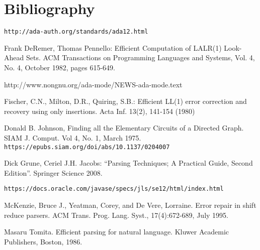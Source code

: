 \documentclass{article}
\begin{document}
\section{Bibliography}
\begin{thebibliography}{9}

 \verb|http://ada-auth.org/standards/ada12.html|

 Frank DeRemer, Thomas Pennello: Efficient
  Computation of LALR(1) Look-Ahead Sets. ACM Transactions on
  Programming Languages and Systems, Vol. 4, No. 4, October 1982,
  pages 615-649.

 http://www.nongnu.org/ada-mode/NEWS-ada-mode.text

  Fischer, C.N., Milton, D.R., Quiring, S.B.:
  Efficient LL(1) error correction and recovery using only insertions.
  Acta Inf. 13(2), 141-154 (1980)

 Donald B. Johnson, Finding all the Elementary Circuits of a Directed Graph.
SIAM J. Comput. Vol 4, No. 1, March 1975.\\ \verb|https://epubs.siam.org/doi/abs/10.1137/0204007|

 Dick Grune, Ceriel J.H. Jacobs: ``Parsing Techniques; A Practical Guide, Second
  Edition''. Springer Science  2008.

  \verb|https://docs.oracle.com/javase/specs/jls/se12/html/index.html|

 McKenzie, Bruce J., Yeatman, Corey, and De
  Vere, Lorraine. Error repair in shift reduce parsers. ACM Trans.
  Prog. Lang. Syst., 17(4):672-689, July 1995.

 Masaru Tomita. Efficient parsing for natural language. Kluwer Academic Publishers, Boston, 1986.
\end{thebibliography}
\end{document}

